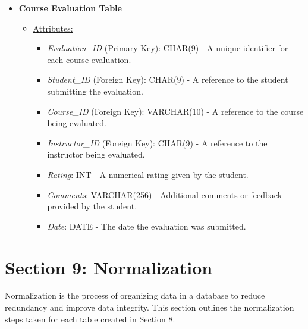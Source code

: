 \documentclass[12pt]{article}
\begin{document}
\begin{itemize}
    \item \textbf{Course Evaluation Table}
    \begin{itemize}
        \item \underline{Attributes:}
        \begin{itemize}
            \item \textit{Evaluation\_ID} (Primary Key): CHAR(9) - A unique identifier for each course evaluation.
            \item \textit{Student\_ID} (Foreign Key): CHAR(9) - A reference to the student submitting the evaluation.
            \item \textit{Course\_ID} (Foreign Key): VARCHAR(10) - A reference to the course being evaluated.
            \item \textit{Instructor\_ID} (Foreign Key): CHAR(9) - A reference to the instructor being evaluated.
            \item \textit{Rating}: INT - A numerical rating given by the student.
            \item \textit{Comments}: VARCHAR(256) - Additional comments or feedback provided by the student.
            \item \textit{Date}: DATE - The date the evaluation was submitted.
        \end{itemize}
    \end{itemize}
    
\end{itemize}


\pagebreak

\section*{Section 9: Normalization}

Normalization is the process of organizing data in a database to reduce redundancy and improve data integrity. This section outlines the normalization steps taken for each table created in Section 8.
\end{document}
